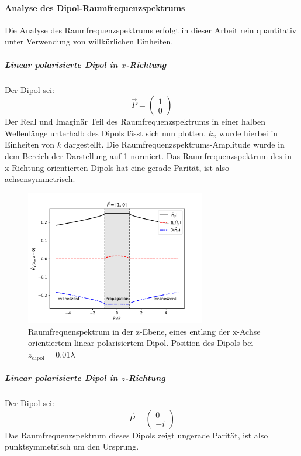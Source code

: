 \documentclass{article}
\begin{document}
	\paragraph{Analyse des Dipol-Raumfrequenzspektrums}
		Die Analyse des Raumfrequenzspektrums erfolgt in dieser Arbeit rein quantitativ unter Verwendung von willkürlichen Einheiten.
		\subparagraph{Linear polarisierte Dipol in $x$-Richtung}
			Der Dipol sei:
			 $$\vec{P} = \begin{pmatrix} 1 \\ 0\end{pmatrix}$$
			Der Real und Imaginär Teil des Raumfrequenzspektrums in einer halben Wellenlänge unterhalb des Dipols lässt sich nun plotten. $k_x$ wurde hierbei in Einheiten von $k$ dargestellt. Die Raumfrequenzspektrums-Amplitude wurde in dem Bereich der Darstellung auf 1 normiert. Das Raumfrequenzspektrum des in x-Richtung orientierten Dipols hat eine gerade Parität, ist also achsensymmetrisch. 
		\begin{figure}[h] 
			\centering
			\includegraphics[width=0.7\textwidth]{figures/spatial_spectrum_x.pdf}
			\caption{Raumfrequenspektrum in der z-Ebene, eines entlang der x-Achse orientiertem linear polarisiertem Dipol. Position des Dipols bei $z_{\mathrm{dipol}} = 0.01 \lambda$}
			\label{fig:spatial_spectrum_x}
		\end{figure}
		\subparagraph{Linear polarisierte Dipol in $z$-Richtung}
			Der Dipol sei:
			$$\vec{P} = \begin{pmatrix} 0 \\ -i\end{pmatrix}$$
			Das Raumfrequenzspektrum dieses Dipols zeigt ungerade Parität, ist also punktsymmetrisch um den Ursprung.
\end{document}
